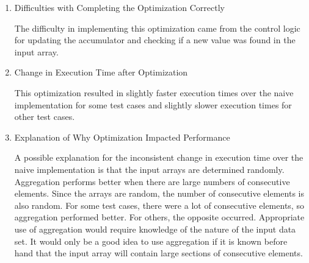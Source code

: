 \documentclass{article}
\begin{document}
\begin{enumerate}
	\item Difficulties with Completing the Optimization Correctly
	
	The difficulty in implementing this optimization came from the control logic for updating the accumulator and checking if a new value was found in the input array. 
	
	\item Change in Execution Time after Optimization
	
	This optimization resulted in slightly faster execution times over the naive implementation for some test cases and slightly slower execution times for other test cases. 
	
	\item Explanation of Why Optimization Impacted Performance
	
	A possible explanation for the inconsistent change in execution time over the naive implementation is that the input arrays are determined randomly. Aggregation performs better when there are large numbers of consecutive elements. Since the arrays are random, the number of consecutive elements is also random. For some test cases, there were a lot of consecutive elements, so aggregation performed better. For others, the opposite occurred. Appropriate use of aggregation would require knowledge of the nature of the input data set. It would only be a good idea to use aggregation if it is known before hand that the input array will contain large sections of consecutive elements.
	
\end{enumerate}
\end{document}
